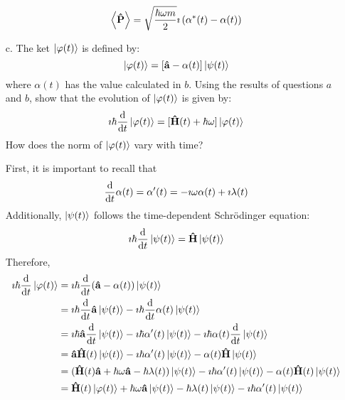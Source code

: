 \documentclass[a4paper,twoside]{article}
\begin{document}
\begin{itemize}
\begin{problem}
\begin{equation}
                \ev{ \vu{P}} = \sqrt{\frac{\hbar \omega m}{2}} \imath \left( \alpha^*(t) - \alpha(t) \right)
            \end{equation}
        \end{problem}
    \item[c.] The ket $\ket{\varphi(t)} $ is defined by:
        \begin{equation}
            \ket{\varphi(t)} = [\vu{a} - \alpha(t)]\ket{\psi(t)}
        \end{equation}
        where $ \alpha(t) $ has the value calculated in $ b $. Using the results of questions $ a $ and $ b $, show that the evolution of $\ket{\varphi(t)} $ is given by:
        \begin{equation}
            \imath \hbar \dv{t}\ket{\varphi(t)} = [\vu{H}(t) + \hbar \omega]\ket{\varphi(t)}
        \end{equation}
        How does the norm of $\ket{\varphi(t)} $ vary with time?
        \begin{problem}
            First, it is important to recall that
            \begin{equation}
                \dv{t} \alpha(t) = \alpha'(t) = - \imath \omega \alpha(t) + \imath \lambda(t)
            \end{equation}
            Additionally, $\ket{\psi(t)} $ follows the time-dependent Schr\"odinger equation:
            \begin{equation}
                \imath \hbar \dv{t}\ket{\psi(t)} = \vu{H}\ket{\psi(t)}
            \end{equation}
            Therefore,
            \begin{align}
                \imath \hbar \dv{t}\ket{\varphi(t)} &= \imath \hbar \dv{t} (\vu{a} - \alpha(t))\ket{\psi(t)} \\
                &= \imath \hbar \dv{t} \vu{a}\ket{\psi(t)} - \imath \hbar \dv{t} \alpha(t)\ket{\psi(t)} \\
                &= \imath \hbar \vu{a} \dv{t}\ket{\psi(t)} - \imath \hbar \alpha'(t)\ket{\psi(t)} - \imath \hbar \alpha(t) \dv{t}\ket{\psi(t)} \\
                &= \vu{a} \vu{H}(t)\ket{\psi(t)} - \imath \hbar \alpha'(t)\ket{\psi(t)} - \alpha(t) \vu{H}\ket{\psi(t)} \\
                &= ( \vu{H}(t) \vu{a} + \hbar \omega \vu{a} - \hbar \lambda(t))\ket{\psi(t)} - \imath \hbar \alpha'(t)\ket{\psi(t)} - \alpha(t) \vu{H}(t)\ket{\psi(t)} \\
                &= \vu{H}(t)\ket{\varphi(t)} + \hbar \omega \vu{a}\ket{\psi(t)} - \hbar \lambda(t)\ket{\psi(t)} - \imath \hbar \alpha'(t)\ket{\psi(t)} \\

\end{align}
\end{problem}
\end{itemize}
\end{document}
